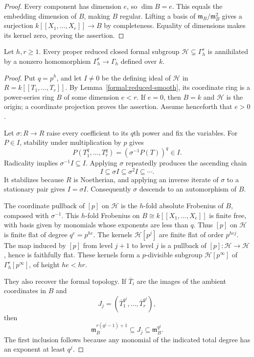 \begin{proof}
Every component has dimension $e$, so $\dim B=e$. This equals the
embedding dimension of $B$, making $B$ regular. Lifting a basis of
$\mathfrak m_B/\mathfrak m_B^2$ gives a surjection
$k[[X_1,\ldots,X_e]]\to B$ by completeness. Equality of dimensions
makes its kernel zero, proving the assertion.
\end{proof}

\begin{lemma}\label{formal:annihilator}
Let $h,r\geq1$. Every proper reduced closed formal subgroup
$\mathcal H\subsetneq\Gamma_h^r$ is annihilated by a nonzero
homomorphism $\Gamma_h^r\to\Gamma_h$ defined over $k$.
\end{lemma}

\begin{proof}
Put $q=p^h$, and let $I\ne0$ be the defining ideal of $\mathcal H$
in $R=k[[T_1,\ldots,T_r]]$. By
Lemma~\ref{formal:reduced-smooth}, its coordinate ring is a power-series
ring $B$ of some dimension $e<r$. If $e=0$, then $B=k$ and
$\mathcal H$ is the origin; a coordinate projection proves the
assertion. Assume henceforth that $e>0$.

Let $\sigma:R\to R$ raise every coefficient to its $q$th power and
fix the variables. For $P\in I$, stability under multiplication by
$p$ gives
\[
  P(T_1^q,\ldots,T_r^q)=(\sigma^{-1}P(T))^q\in I.
\]
Radicality implies $\sigma^{-1}I\subseteq I$. Applying $\sigma$
repeatedly produces the ascending chain
\[
  I\subseteq\sigma I\subseteq\sigma^2 I\subseteq\cdots.
\]
It stabilizes because $R$ is Noetherian, and applying an inverse
iterate of $\sigma$ to a stationary pair gives $I=\sigma I$.
Consequently $\sigma$ descends to an automorphism of $B$.

The coordinate pullback of $[p]$ on $\mathcal H$ is the $h$-fold
absolute Frobenius of $B$, composed with $\sigma^{-1}$. This $h$-fold
Frobenius on $B\cong k[[X_1,\ldots,X_e]]$ is finite free, with basis given by
monomials whose exponents are less than $q$. Thus $[p]$ on
$\mathcal H$ is finite flat of degree $q^e=p^{he}$.
The kernels $\mathcal H[p^j]$ are finite flat of order $p^{hej}$.
The map induced by $[p]$ from level $j+1$ to level $j$ is a pullback
of $[p]:\mathcal H\to\mathcal H$, hence is faithfully flat.
These kernels form a $p$-divisible subgroup $\mathcal H[p^\infty]$
of $\Gamma_h^r[p^\infty]$, of height $he<hr$.

They also recover the formal topology. If $\overline T_i$ are the
images of the ambient coordinates in $B$ and
\[
  J_j=(\overline T_1^{q^j},\ldots,\overline T_r^{q^j}),
\]
then
\begin{equation}\label{formal:kernel-topology}
  \mathfrak m_B^{r(q^j-1)+1}\subseteq J_j
  \subseteq\mathfrak m_B^{q^j}.
\end{equation}
The first inclusion follows because any monomial of the indicated
total degree has an exponent at least $q^j$.


\end{proof}
